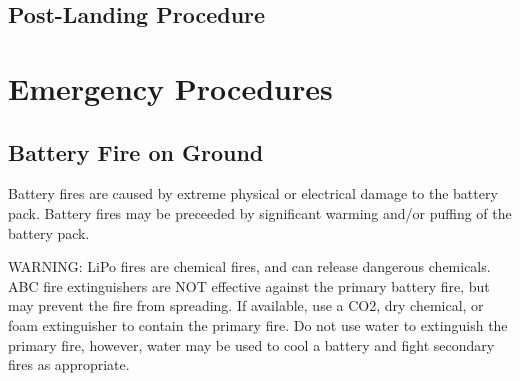 \documentclass{report}
\begin{document}
	\section{Post-Landing Procedure}
\chapter{Emergency Procedures}
	\section{Battery Fire on Ground}
		Battery fires are caused by extreme physical or electrical damage to the battery pack.  Battery fires may be preceeded by significant warming and/or puffing of the battery pack.
		\begin{mdframed}[linecolor=red,linewidth=4pt]
			WARNING: \gls{LiPo} fires are chemical fires, and can release dangerous chemicals.  ABC fire extinguishers are NOT effective against the primary battery fire, but may prevent the fire from spreading.  If available, use a CO2, dry chemical, or foam extinguisher to contain the primary fire.  Do not use water to extinguish the primary fire, however, water may be used to cool a battery and fight secondary fires as appropriate.
		\end{mdframed}
\end{document}
